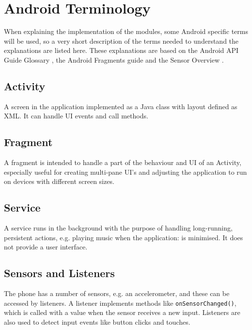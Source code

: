 \section{Android Terminology}
When explaining the implementation of the modules, some Android specific terms will be used, so a very short description of the terms needed to understand the explanations are listed here. These explanations are based on the Android API Guide Glossary \cite{android:terms}, the Android Fragments guide \cite{android:fragment} and the Sensor Overview \cite{android:sensor}.

\subsection*{Activity}
A screen in the application implemented as a Java class with layout defined as XML. It can handle UI events and call methods.

\subsection*{Fragment}
A fragment is intended to handle a part of the behaviour and UI of an Activity, especially useful for creating multi-pane UI's and adjusting the application to run on devices with different screen sizes.

\subsection*{Service}
A service runs in the background with the purpose of handling long-running, persistent actions, e.g. playing music when the application: is minimised. It does not provide a user interface.

\subsection*{Sensors and Listeners}
The phone has a number of sensors, e.g. an accelerometer, and these can be accessed by listeners. A listener implements methods like \texttt{onSensorChanged()}, which is called with a value when the sensor receives a new input. Listeners are also used to detect input events like button clicks and touches.
